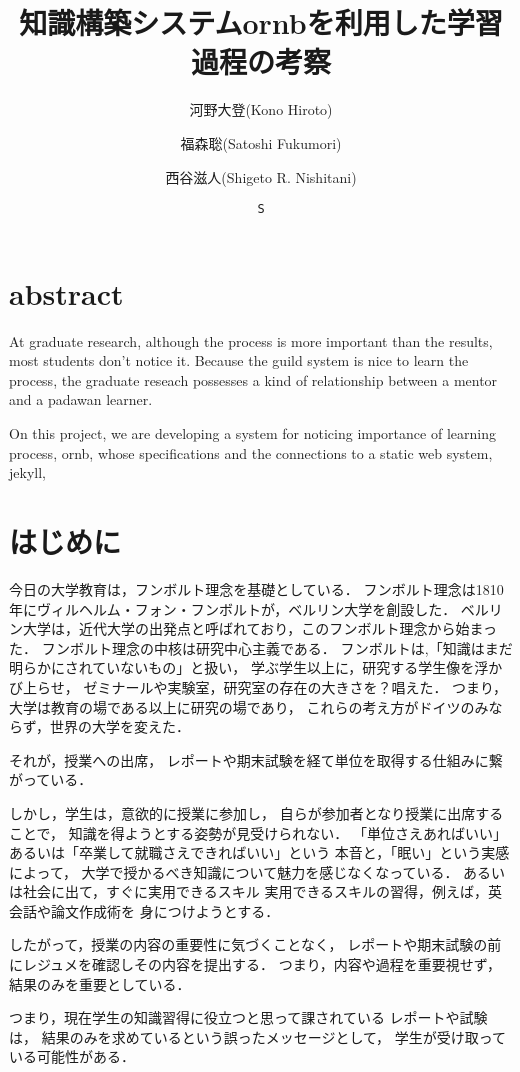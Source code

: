 \documentclass[12pt,a4]{jreport}%
\author[1]{河野大登(Kono Hiroto)}
\author[1]{福森聡(Satoshi Fukumori)}
\author[1]{西谷滋人(Shigeto R. Nishitani)}
\affil[1]{関西学院大学理工学部情報科学科(三田市)．Department of Informatics, Kwansei Gakuin University(Sanda-shi, Hyogo).}
\author{\texttt{S}}
\date{}
\title{知識構築システムornbを利用した学習過程の考察}
\begin{document}
\maketitle


\chapter{abstract}
\label{sec:org5fcc89d}
At graduate research, 
although the process is more important than the results,
most students don't notice it.
Because the guild system is nice to learn the process,
the graduate reseach possesses a kind of
relationship between 
a mentor and a padawan learner.

On this project, 
we are developing a system for
noticing importance of learning process,
ornb, whose specifications and the 
connections to a static web system, jekyll,

\chapter{はじめに}
\label{sec:org967ef3c}
今日の大学教育は，フンボルト理念を基礎としている．
フンボルト理念は1810年にヴィルヘルム・フォン・フンボルトが，ベルリン大学を創設した．
ベルリン大学は，近代大学の出発点と呼ばれており，このフンボルト理念から始まった．
フンボルト理念の中核は研究中心主義である．
フンボルトは,「知識はまだ明らかにされていないもの」と扱い，
学ぶ学生以上に，研究する学生像を浮かび上らせ，
ゼミナールや実験室，研究室の存在の大きさを？唱えた．
つまり，大学は教育の場である以上に研究の場であり，
これらの考え方がドイツのみならず，世界の大学を変えた．

それが，授業への出席，
レポートや期末試験を経て単位を取得する仕組みに繋がっている．

しかし，学生は，意欲的に授業に参加し，
自らが参加者となり授業に出席することで，
知識を得ようとする姿勢が見受けられない．
「単位さえあればいい」あるいは「卒業して就職さえできればいい」という
本音と，「眠い」という実感によって，
大学で授かるべき知識について魅力を感じなくなっている．
あるいは社会に出て，すぐに実用できるスキル
実用できるスキルの習得，例えば，英会話や論文作成術を
身につけようとする．

したがって，授業の内容の重要性に気づくことなく，
レポートや期末試験の前にレジュメを確認しその内容を提出する．
つまり，内容や過程を重要視せず，結果のみを重要としている．

つまり，現在学生の知識習得に役立つと思って課されている
レポートや試験は，
結果のみを求めているという誤ったメッセージとして，
学生が受け取っている可能性がある．
\end{document}
